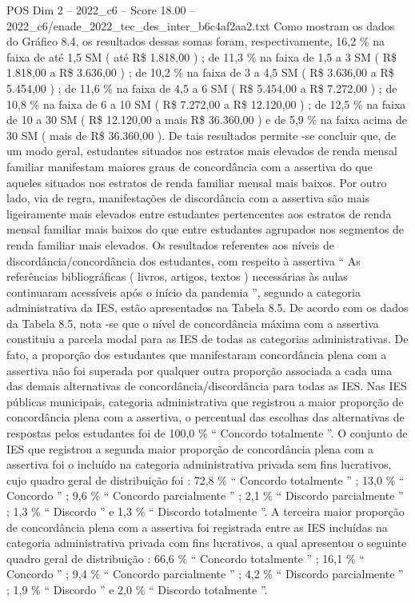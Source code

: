 \begin{textsample}{POS Dim 2 – 2022\_c6 – Score 18.00 – 2022\_c6/enade\_2022\_tec\_des\_inter\_b6c4af2aa2.txt}
Como mostram os dados do Gráfico 8.4, os resultados dessas somas foram, respectivamente, 16,2 \% na faixa de até 1,5 SM ( até R\$ 1.818,00 ) ; de 11,3 \% na faixa de 1,5 a 3 SM ( R\$ 1.818,00 a R\$ 3.636,00 ) ; de 10,2 \% na faixa de 3 a 4,5 SM ( R\$ 3.636,00 a R\$ 5.454,00 ) ; de 11,6 \% na faixa de 4,5 a 6 SM ( R\$ 5.454,00 a R\$ 7.272,00 ) ; de 10,8 \% na faixa de 6 a 10 SM ( R\$ 7.272,00 a R\$ 12.120,00 ) ; de 12,5 \% na faixa de 10 a 30 SM ( R\$ 12.120,00 a mais R\$ 36.360,00 ) e de 5,9 \% na faixa acima de 30 SM ( mais de R\$ 36.360,00 ).
De tais resultados permite -se concluir que, de um modo geral, estudantes situados nos estratos mais elevados de renda mensal familiar manifestam maiores graus de concordância com a assertiva do que aqueles situados nos estratos de renda familiar mensal mais baixos.
Por outro lado, via de regra, manifestações de discordância com a assertiva são mais ligeiramente mais elevados entre estudantes pertencentes aos estratos de renda mensal familiar mais baixos do que entre estudantes agrupados nos segmentos de renda familiar mais elevados.
Os resultados referentes aos níveis de discordância/concordância dos estudantes, com respeito à assertiva “ As referências bibliográficas ( livros, artigos, textos ) necessárias às aulas continuaram acessíveis após o início da pandemia ”, segundo a categoria administrativa da IES, estão apresentados na Tabela 8.5.
De acordo com os dados da Tabela 8.5, nota -se que o nível de concordância máxima com a assertiva constituiu a parcela modal para as IES de todas as categorias administrativas.
De fato, a proporção dos estudantes que manifestaram concordância plena com a assertiva não foi superada por qualquer outra proporção associada a cada uma das demais alternativas de concordância/discordância para todas as IES.
Nas IES públicas municipais, categoria administrativa que registrou a maior proporção de concordância plena com a assertiva, o percentual das escolhas das alternativas de respostas pelos estudantes foi de 100,0 \% “ Concordo totalmente ”.
O conjunto de IES que registrou a segunda maior proporção de concordância plena com a assertiva foi o incluído na categoria administrativa privada sem fins lucrativos, cujo quadro geral de distribuição foi : 72,8 \% “ Concordo totalmente ” ; 13,0 \% “ Concordo ” ; 9,6 \% “ Concordo parcialmente ” ; 2,1 \% “ Discordo parcialmente ” ; 1,3 \% “ Discordo ” e 1,3 \% “ Discordo totalmente ”.
A terceira maior proporção de concordância plena com a assertiva foi registrada entre as IES incluídas na categoria administrativa privada com fins lucrativos, a qual apresentou o seguinte quadro geral de distribuição : 66,6 \% “ Concordo totalmente ” ; 16,1 \% “ Concordo ” ; 9,4 \% “ Concordo parcialmente ” ; 4,2 \% “ Discordo parcialmente ” ; 1,9 \% “ Discordo ” e 2,0 \% “ Discordo totalmente ”.

\end{textsample}
